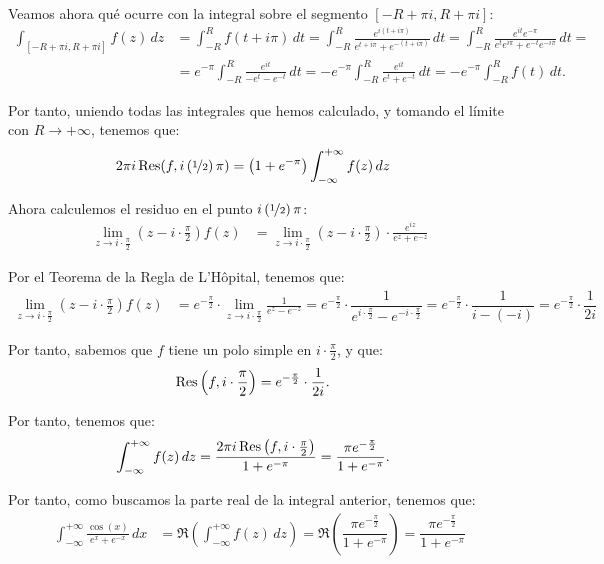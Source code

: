 \begin{ejercicio}
    Veamos ahora qué ocurre con la integral sobre el segmento $[-R + \pi i, R + \pi i]$:
    \begin{align*}
        \int_{[-R + \pi i, R + \pi i]} f(z) \, dz &= \int_{-R}^{R} f(t + i\pi) \, dt
        = \int_{-R}^{R} \frac{e^{i(t + i\pi)}}{e^{t + i\pi} + e^{-(t + i\pi)}} \, dt
        = \int_{-R}^{R} \frac{e^{it}e^{-\pi}}{e^{t}e^{i\pi} + e^{-t}e^{-i\pi}} \, dt
        =\\&= e^{-\pi}\int_{-R}^{R} \frac{e^{it}}{- e^t - e^{-t}} \, dt
        = -e^{-\pi}\int_{-R}^{R} \frac{e^{it}}{e^t + e^{-t}} \, dt
        = -e^{-\pi}\int_{-R}^{R} f(t) \, dt.
    \end{align*}

    Por tanto, uniendo todas las integrales que hemos calculado, y tomando el límite con $R\to +\infty$, tenemos que:
    \begin{align*}
        2\pi i\operatorname{Res}(f, i\left(\nicefrac{1}{2}\right)\pi) &= \left(1+e^{-\pi}\right)\int_{-\infty}^{+\infty} f(z) \, dz
    \end{align*}

    Ahora calculemos el residuo en el punto $i\left(\nicefrac{1}{2}\right)\pi$:
    \begin{align*}
        \lim_{z\to i\cdot \frac{\pi}{2}} \left(z - i\cdot \frac{\pi}{2}\right)f(z) &= \lim_{z\to i\cdot \frac{\pi}{2}} \left(z - i\cdot \frac{\pi}{2}\right)\cdot \frac{e^{iz}}{e^z + e^{-z}}
    \end{align*}

    Por el Teorema de la Regla de L'Hôpital, tenemos que:
    \begin{align*}
        \lim_{z\to i\cdot \frac{\pi}{2}} \left(z - i\cdot \frac{\pi}{2}\right)f(z) &= e^{-\frac{\pi}{2}}\cdot \lim_{z\to i\cdot \frac{\pi}{2}} \frac{1}{e^z - e^{-z}}
        = e^{-\frac{\pi}{2}}\cdot \dfrac{1}{e^{i\cdot \frac{\pi}{2}} - e^{-i\cdot \frac{\pi}{2}}}
        = e^{-\frac{\pi}{2}}\cdot \dfrac{1}{i - (-i)} = e^{-\frac{\pi}{2}}\cdot \dfrac{1}{2i}
    \end{align*}

    Por tanto, sabemos que $f$ tiene un polo simple en $i\cdot \frac{\pi}{2}$, y que:
    \begin{align*}
        \operatorname{Res}\left(f, i\cdot \frac{\pi}{2}\right) &= e^{-\frac{\pi}{2}}\cdot \dfrac{1}{2i}.
    \end{align*}

    Por tanto, tenemos que:
    \begin{align*}
        \int_{-\infty}^{+\infty} f(z) \, dz &= \dfrac{2\pi i\operatorname{Res}\left(f, i\cdot \frac{\pi}{2}\right)}{1 + e^{-\pi}}
        = \dfrac{\pi e^{-\frac{\pi}{2}}}{1 + e^{-\pi}}.
    \end{align*}

    Por tanto, como buscamos la parte real de la integral anterior, tenemos que:
    \begin{align*}
        \int_{-\infty}^{+\infty} \frac{\cos(x)}{e^x + e^{-x}} \, dx &= \Re\left(\int_{-\infty}^{+\infty} f(z) \, dz\right) = \Re\left(\dfrac{\pi e^{-\frac{\pi}{2}}}{1 + e^{-\pi}}\right)
        = \dfrac{\pi e^{-\frac{\pi}{2}}}{1 + e^{-\pi}}
    \end{align*}
\end{ejercicio}

